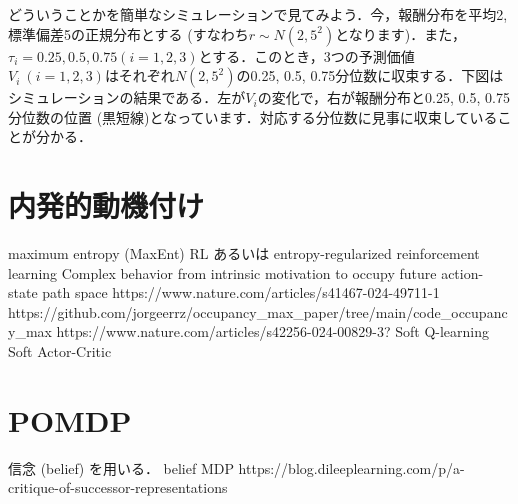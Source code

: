 どういうことかを簡単なシミュレーションで見てみよう．今，報酬分布を平均2, 標準偏差5の正規分布とする (すなわち$r \sim N(2, 5^2)$となります)．また，$\tau_i = 0.25, 0.5, 0.75 (i=1,2,3)$とする．このとき，3つの予測価値 $V_i \ (i=1,2,3)$はそれぞれ$N(2, 5^2)$の0.25, 0.5,
0.75分位数に収束する．下図はシミュレーションの結果である．左が$V_i$の変化で，右が報酬分布と0.25, 0.5, 0.75分位数の位置 (黒短線)となっています．対応する分位数に見事に収束していることが分かる．
\section{内発的動機付け}
maximum entropy (MaxEnt) RL
あるいは
entropy-regularized reinforcement learning
Complex behavior from intrinsic motivation to occupy future
action-state path space
https://www.nature.com/articles/s41467-024-49711-1
https://github.com/jorgeerrz/occupancy_max_paper/tree/main/code_occupancy_max
https://www.nature.com/articles/s42256-024-00829-3?
Soft Q-learning
Soft Actor-Critic
\section{POMDP}
信念 (belief) を用いる．
belief MDP
https://blog.dileeplearning.com/p/a-critique-of-successor-representations
